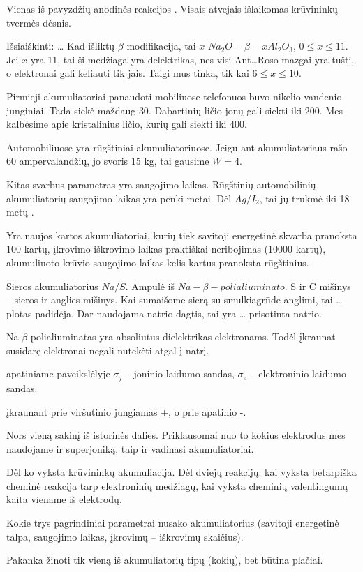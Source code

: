 Vienas iš pavyzdžių anodinės reakcijos .
Visais atvejais išlaikomas krūvininkų tvermės dėsnis.

Išsiaiškinti:
…
Kad išliktų $\beta$ modifikacija, tai $x$ $Na_{2}O-\beta-x Al_{2}O_{3}$,
$0 \leq x \leq 11$. Jei $x$ yra 11, tai ši medžiaga yra delektrikas,
nes visi Ant…Roso mazgai yra tušti, o elektronai gali keliauti tik
jais. Taigi mus tinka, tik kai $6 \leq x \leq 10$.

Pirmieji akumuliatoriai panaudoti mobiliuose telefonuos buvo nikelio
vandenio junginiai. Tada siekė maždaug $30$. Dabartinių ličio
jonų gali siekti iki $200$. Mes kalbėsime apie kristalinius
ličio, kurių gali siekti iki $400$.

Automobiliuose yra rūgštiniai akumuliatoriuose. Jeigu ant akumuliatoriaus
rašo 60 ampervalandžių, jo svoris 15 kg, tai gausime $W=4$.

Kitas svarbus parametras yra saugojimo laikas. Rūgštinių automobilinių
akumuliatorių saugojimo laikas yra penki metai. Dėl $Ag/I_{2}$, tai
jų trukmė iki 18 metų .

Yra naujos kartos akumuliatoriai, kurių tiek savitoji energetinė
skvarba pranoksta 100 kartų, įkrovimo iškrovimo laikas praktiškai
neribojimas (10000 kartų), akumuliuoto krūvio saugojimo laikas
kelis kartus pranoksta rūgštinius.

Sieros akumuliatorius  $Na/S$. Ampulė iš
$Na-\beta-polialiuminato$. S ir C mišinys – sieros ir anglies mišinys.
Kai sumaišome sierą su smulkiagrūde anglimi, tai … plotas padidėja.
Dar naudojama natrio dagtis, tai yra … prisotinta natrio.

Na-$\beta$-polialiuminatas yra absoliutus dielektrikas elektronams.
Todėl įkraunat susidarę elektronai negali nutekėti atgal į natrį.

 apatiniame paveikslėlyje $\sigma_{j}$ – joninio laidumo
sandas, $\sigma_{e}$ – elektroninio laidumo sandas.

 įkraunant prie viršutinio jungiamas +, o prie apatinio
-.

\begin{remember}
  \item Nors vieną sakinį iš istorinės dalies. Priklausomai nuo to
    kokius elektrodus mes naudojame ir superjoniką, taip ir vadinasi
    akumuliatoriai.
  \item Dėl ko vyksta krūvininkų akumuliacija. Dėl dviejų reakcijų:
    kai vyksta betarpiška cheminė reakcija tarp elektroninių medžiagų,
    kai vyksta cheminių valentingumų kaita viename iš elektrodų.
  \item Kokie trys pagrindiniai parametrai nusako akumuliatorius
    (savitoji energetinė talpa, saugojimo laikas, įkrovimų – iškrovimų
    skaičius).
  \item Pakanka žinoti tik vieną iš akumuliatorių tipų (kokių),
    bet būtina plačiai.
\end{remember}

